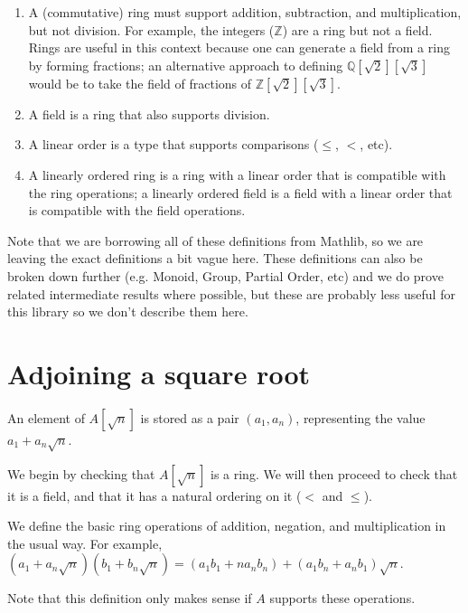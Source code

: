 \begin{enumerate}
\item A (commutative) ring must support addition, subtraction, and
multiplication, but not division. For example, the integers ($ℤ$) are a ring
but not a field. Rings are useful in this context because one can generate a
field from a ring by forming fractions; an alternative approach to defining
$ℚ[\sqrt{2}][\sqrt{3}]$ would be to take the field of fractions of
$ℤ[\sqrt{2}][\sqrt{3}]$.

\item A field is a ring that also supports division.

\item A linear order is a type that supports comparisons ($≤$, $<$, etc).

\item A linearly ordered ring is a ring with a linear order that is compatible
with the ring operations; a linearly ordered field is a field with a linear
order that is compatible with the field operations.
\end{enumerate}

Note that we are borrowing all of these definitions from Mathlib, so we are
leaving the exact definitions a bit vague here.  These definitions can also be
broken down further (e.g. Monoid, Group, Partial Order, etc) and we do prove
related intermediate results where possible, but these are probably less useful
for this library so we don't describe them here.

\section{Adjoining a square root}


\begin{definition}
  \label{def:adjoin}
  \leanok
  An element of $A[\sqrt{n}]$ is stored as a pair $(a_1, a_n)$, representing the value
  $a_1 + a_n\sqrt{n}$.
\end{definition}

We begin by checking that $A[\sqrt{n}]$ is a ring. We will then proceed to check
that it is a field, and that it has a natural ordering on it ($<$ and $≤$).

\begin{definition}
  \label{def:adjoinRingOps}
  \leanok
  We define the basic ring operations of addition, negation, and multiplication
  in the usual way.
  For example, $(a_1 + a_n\sqrt{n})(b_1 + b_n\sqrt{n}) = (a_1b_1 + na_nb_n) + (a_1b_n + a_nb_1)\sqrt{n}$.

  Note that this definition only makes sense if $A$ supports these operations.
\end{definition}

